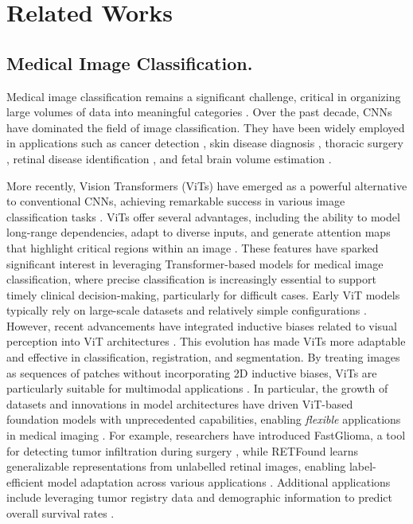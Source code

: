 \section{Related Works}
\label{sec:2}

\subsection{Medical Image Classification.}
Medical image classification remains a significant challenge, critical in organizing large volumes of data into meaningful categories \cite{azad2024advances}. Over the past decade, CNNs have dominated the field of image classification. They have been widely employed in applications such as cancer detection \cite{ren2023ipsilateral}, skin disease diagnosis \cite{elbatel2023fopro}, thoracic surgery \cite{harirpoush2024architecture}, retinal disease identification \cite{ju2023hierarchical}, and fetal brain volume estimation \cite{pei2023pets}.

More recently, Vision Transformers (ViTs) have emerged as a powerful alternative to conventional CNNs, achieving remarkable success in various image classification tasks \cite{swin, mobilevit_v2, Twins, CSWin}. ViTs offer several advantages, including the ability to model long-range dependencies, adapt to diverse inputs, and generate attention maps that highlight critical regions within an image \cite{gheflati2022vision}. These features have sparked significant interest in leveraging Transformer-based models for medical image classification, where precise classification is increasingly essential to support timely clinical decision-making, particularly for difficult cases.
Early ViT models typically rely on large-scale datasets and relatively simple configurations \cite{ViT}. However, recent advancements have integrated inductive biases related to visual perception into ViT architectures \cite{manzari2023robust, yu2022metaformer, wang2024repvit, yan2023hybrid}. This evolution has made ViTs more adaptable and effective in classification, registration, and segmentation. By treating images as sequences of patches without incorporating 2D inductive biases, ViTs are particularly suitable for multimodal applications \cite{xu2023research}.
In particular, the growth of datasets and innovations in model architectures have driven ViT-based foundation models with unprecedented capabilities, enabling \textit{flexible} applications in medical imaging \cite{manigrasso2025mammography, horst2024cellvit, koleilat2024medclip}. For example, researchers have introduced FastGlioma, a tool for detecting tumor infiltration during surgery \cite{kondepudi2024foundation}, while RETFound learns generalizable representations from unlabelled retinal images, enabling label-efficient model adaptation across various applications \cite{zhou2023foundation}. Additional applications include leveraging tumor registry data and demographic information to predict overall survival rates \cite{jee2024automated}. %


